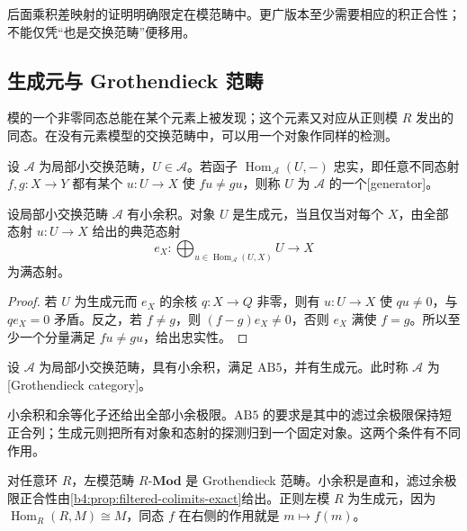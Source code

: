后面乘积差映射的证明明确限定在模范畴中。更广版本至少需要相应的积正合性；不能仅凭“也是交换范畴”便移用。

\subsection{生成元与 Grothendieck 范畴}
\label{b4:subsec:grothendieck-category}

模的一个非零同态总能在某个元素上被发现；这个元素又对应从正则模 \(R\) 发出的同态。在没有元素模型的交换范畴中，可以用一个对象作同样的检测。

\begin{definition}\label{b4:def:abelian-generator}
	设 \(\mathcal A\) 为局部小交换范畴，\(U\in\mathcal A\)。若函子 \(\operatorname{Hom}_{\mathcal A}(U,-)\) 忠实，即任意不同态射 \(f,g:X\to Y\) 都有某个 \(u:U\to X\) 使 \(fu\ne gu\)，则称 \(U\) 为 \(\mathcal A\) 的一个[generator]。
\end{definition}

\begin{proposition}\label{b4:prop:generator-epimorphism}
	设局部小交换范畴 \(\mathcal A\) 有小余积。对象 \(U\) 是生成元，当且仅当对每个 \(X\)，由全部态射 \(u:U\to X\) 给出的典范态射
	\[
		e_X:\bigoplus_{u\in\operatorname{Hom}_{\mathcal A}(U,X)}U\longrightarrow X
	\]
	为满态射。
\end{proposition}
\begin{proof}
	若 \(U\) 为生成元而 \(e_X\) 的余核 \(q:X\to Q\) 非零，则有 \(u:U\to X\) 使 \(qu\ne0\)，与 \(qe_X=0\) 矛盾。反之，若 \(f\ne g\)，则 \((f-g)e_X\ne0\)，否则 \(e_X\) 满使 \(f=g\)。所以至少一个分量满足 \(fu\ne gu\)，给出忠实性。
\end{proof}

\begin{definition}\label{b4:def:grothendieck-category}
	设 \(\mathcal A\) 为局部小交换范畴，具有小余积，满足 \(\mathrm{AB5}\)，并有生成元。此时称 \(\mathcal A\) 为[Grothendieck category]。
\end{definition}

小余积和余等化子还给出全部小余极限。\(\mathrm{AB5}\) 的要求是其中的滤过余极限保持短正合列；生成元则把所有对象和态射的探测归到一个固定对象。这两个条件有不同作用。

\begin{example}\label{b4:exm:module-grothendieck}
	对任意环 \(R\)，左模范畴 \(R\text{-}\mathbf{Mod}\) 是 Grothendieck 范畴。小余积是直和，滤过余极限正合性由\cref{b4:prop:filtered-colimits-exact}给出。正则左模 \(R\) 为生成元，因为 \(\operatorname{Hom}_R(R,M)\cong M\)，同态 \(f\) 在右侧的作用就是 \(m\mapsto f(m)\)。
\end{example}

